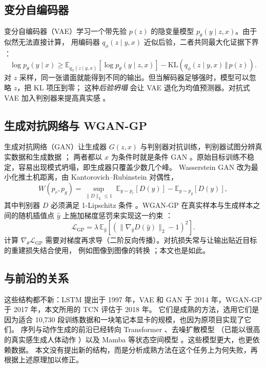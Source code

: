 \documentclass[11pt,a4paper,fontset=windows]{ctexart}
\newcommand{\E}{\mathbb{E}}
\begin{document}
\subsection{变分自编码器}
变分自编码器（VAE）学习一个带先验 $p(z)$ 的隐变量模型 $p_\theta(y\mid z,x)$。由于似然无法直接计算，
用编码器 $q_\phi(z\mid y,x)$ 近似后验，二者共同最大化证据下界 \citep{kingma2014vae, rezende2014}：
\begin{equation}
  \log p_\theta(y\mid x) \ge \E_{q_\phi(z\mid y,x)}\left[\log p_\theta(y\mid z,x)\right]
  - \mathrm{KL}\left(q_\phi(z\mid y,x)\,\Vert\,p(z)\right).
\end{equation}
对 $z$ 采样，同一张谱面就能得到不同的输出。但当解码器足够强时，模型可以忽略 $z$，把 KL 项压到零；
这种\emph{后验坍塌} \citep{bowman2016} 会让 VAE 退化为均值预测器。对抗式 VAE 加入判别器来提高真实感 \citep{plumerault2020}。

\subsection{生成对抗网络与 WGAN-GP}
生成对抗网络（GAN）让生成器 $G(z,x)$ 与判别器对抗训练，判别器试图分辨真实数据和生成数据 \citep{goodfellow2014}；
两者都以 $x$ 为条件时就是条件 GAN \citep{mirza2014}。原始目标训练不稳定，容易出现模式坍塌，即生成器只覆盖少数几个峰。
Wasserstein GAN 改为最小化推土机距离，由 Kantorovich--Rubinstein 对偶性，
\begin{equation}
  W(p_r,p_g)=\sup_{\lVert D\rVert_L\le 1}\;\E_{y\sim p_r}[D(y)]-\E_{y\sim p_g}[D(y)],
\end{equation}
其中判别器 $D$ 必须满足 1-Lipschitz 条件 \citep{arjovsky2017}。WGAN-GP 在真实样本与生成样本之间的随机插值点 $\hat y$
上施加梯度惩罚来实现这一约束 \citep{gulrajani2017}：
\begin{equation}
  \mathcal{L}_{\mathrm{GP}} = \lambda\,\E_{\hat y}\left[\left(\lVert\nabla_{\hat y} D(\hat y)\rVert_2-1\right)^2\right].
  \label{eq:gp}
\end{equation}
计算 $\nabla_\theta\mathcal{L}_{\mathrm{GP}}$ 需要对梯度再求导（二阶反向传播）。对抗损失常与让输出贴近目标的重建损失结合使用，
例如图像到图像的转换 \citep{isola2017}；本文也是如此。

\subsection{与前沿的关系}
\label{sec:frontier}
这些结构都不新：LSTM 提出于 1997 年，VAE 和 GAN 于 2014 年，WGAN-GP 于 2017 年，本文所用的 TCN 评估于 2018 年。
它们是成熟的方法，选用它们是因为适合 10{,}730 段训练数据和一块笔记本显卡的规模，也因为原项目实现了它们。
序列与动作生成的前沿已经转向 Transformer \citep{vaswani2017}、去噪扩散模型 \citep{ho2020}
（已能以很高的真实感生成人体动作 \citep{tevet2023}）以及 Mamba 等状态空间模型 \citep{gu2023}。这些模型更大，也更依赖数据。
本文没有提出新的结构，而是分析成熟方法在这个任务上为何失败，再根据上述原理加以修正。
\end{document}
